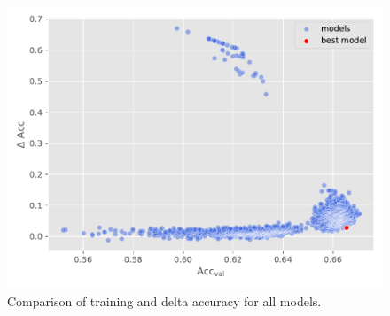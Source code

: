 \documentclass[
  12pt,
  bibliography=totoc,     %
  captions=tableheading,  %
  titlepage=firstiscover, %
]{scrartcl}
\begin{document}
\begin{figure}[H]
  \centering
  \includegraphics[scale=0.70]{figures/NN/HPO_scatter.pdf}
  \caption{Comparison of training and delta accuracy for all models.}
  \label{fig:HPO_scatter}
\end{figure}
\end{document}
